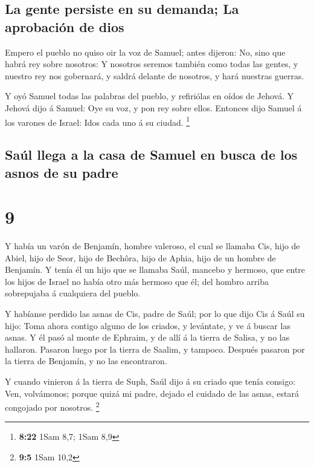 \hypertarget{la-gente-persiste-en-su-demanda-la-aprobaciuxf3n-de-dios}{%
\subsection{La gente persiste en su demanda; La aprobación de
dios}\label{la-gente-persiste-en-su-demanda-la-aprobaciuxf3n-de-dios}}

 Empero el pueblo no quiso oir la voz de Samuel; antes
dijeron: No, sino que habrá rey sobre nosotros:  Y nosotros
seremos también como todas las gentes, y nuestro rey nos gobernará, y
saldrá delante de nosotros, y hará nuestras guerras.

 Y oyó Samuel todas las palabras del pueblo, y refiriólas
en oídos de Jehová.  Y Jehová dijo á Samuel: Oye su voz, y
pon rey sobre ellos. Entonces dijo Samuel á los varones de Israel: Idos
cada uno á su ciudad. \footnote{\textbf{8:22} 1Sam 8,7; 1Sam 8,9}

\hypertarget{sauxfal-llega-a-la-casa-de-samuel-en-busca-de-los-asnos-de-su-padre}{%
\subsection{Saúl llega a la casa de Samuel en busca de los asnos de su
padre}\label{sauxfal-llega-a-la-casa-de-samuel-en-busca-de-los-asnos-de-su-padre}}

\hypertarget{section-8}{%
\section{9}\label{section-8}}

 Y había un varón de Benjamín, hombre valeroso, el cual se
llamaba Cis, hijo de Abiel, hijo de Seor, hijo de Bechôra, hijo de
Aphia, hijo de un hombre de Benjamín.  Y tenía él un hijo
que se llamaba Saúl, mancebo y hermoso, que entre los hijos de Israel no
había otro más hermoso que él; del hombro arriba sobrepujaba á
cualquiera del pueblo.

 Y habíanse perdido las asnas de Cis, padre de Saúl; por lo
que dijo Cis á Saúl su hijo: Toma ahora contigo alguno de los criados, y
levántate, y ve á buscar las asnas.  Y él pasó al monte de
Ephraim, y de allí á la tierra de Salisa, y no las hallaron. Pasaron
luego por la tierra de Saalim, y tampoco. Después pasaron por la tierra
de Benjamín, y no las encontraron.

 Y cuando vinieron á la tierra de Suph, Saúl dijo á su
criado que tenía consigo: Ven, volvámonos; porque quizá mi padre, dejado
el cuidado de las asnas, estará congojado por nosotros. \footnote{\textbf{9:5}
  1Sam 10,2}

